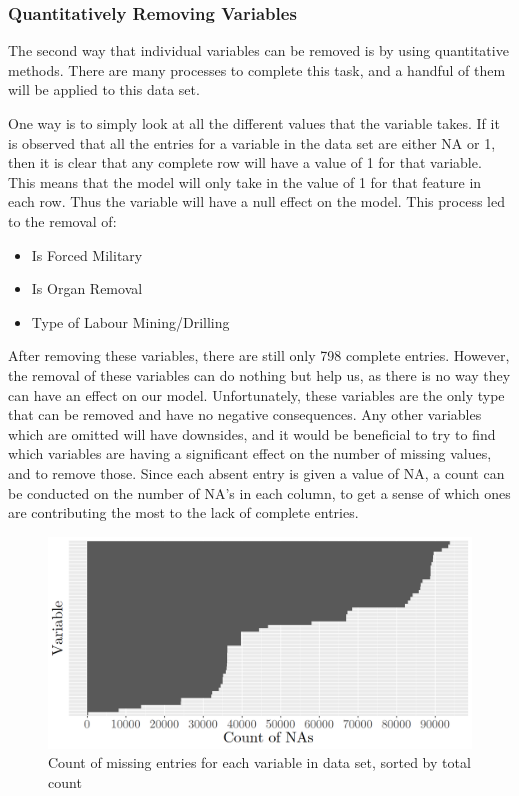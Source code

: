 \documentclass{article} %
\begin{document}
	
	\subsubsection{Quantitatively Removing Variables} \label{QuantRemove}
	
	The second way that individual variables can be removed is by using quantitative methods. There are many processes to complete this task, and a handful of them will be applied to this data set. 
	
	One way is to simply look at all the different values that the variable takes. If it is observed that all the entries for a variable in the data set are either NA or 1, then it is clear that any complete row will have a value of 1 for that variable. This means that the model will only take in the value of 1 for that feature in each row. Thus the variable will have a null effect on the model. This process led to the removal of:
	

	\begin{multicols}{2}
		\begin{itemize}
			\item Is Forced Military
			\item Is Organ Removal
			\item Type of Labour Mining/Drilling
		\end{itemize}
	\end{multicols}
	
	After removing these variables, there are still only 798 complete entries. However, the removal of these variables can do nothing but help us, as there is no way they can have an effect on our model. Unfortunately, these variables are the only type that can be removed and have no negative consequences. Any other variables which are omitted will have downsides, and it would be beneficial to try to find which variables are having a significant effect on the number of missing values, and to remove those. Since each absent entry is given a value of NA, a count can be conducted on the number of NA's in each column, to get a sense of which ones are contributing the most to the lack of complete entries.
	
	\begin{figure}[H]
		\includegraphics[width = \textwidth]{NABarplot}
		\caption{Count of missing entries for each variable in data set, sorted by total count}
		\label{fig:NABarplot}
	\end{figure}
	
\end{document}
